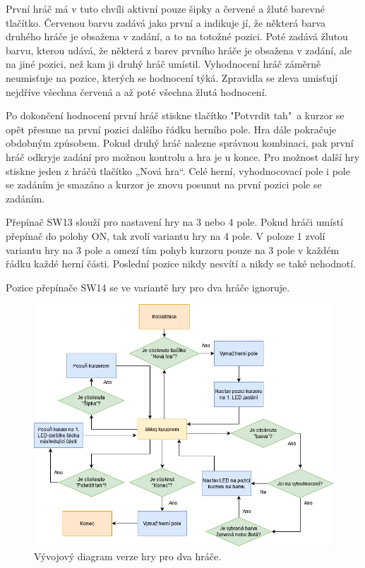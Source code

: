 První hráč má v tuto chvíli aktivní pouze šipky a červené a žluté barevné tlačítko. Červenou barvu zadává jako první a 
indikuje jí, že některá barva druhého hráče je obsažena v zadání, a to na totožné pozici. Poté zadává žlutou barvu, kterou 
udává, že některá z barev prvního hráče je obsažena v zadání, ale na jiné pozici, než kam ji druhý hráč umístil. Vyhodnocení 
hráč záměrně neumisťuje na pozice, kterých se hodnocení týká. Zpravidla se zleva umisťují nejdříve všechna červená a až poté 
všechna žlutá hodnocení. 

Po dokončení hodnocení první hráč stiskne tlačítko "Potvrdit tah"\  a kurzor se opět přesune na první pozici dalšího řádku herního pole. 
Hra dále pokračuje obdobným způsobem.
Pokud druhý hráč nalezne správnou kombinaci, pak první hráč odkryje zadání pro možnou kontrolu a hra je u konce. Pro možnost další 
hry stiskne jeden z hráčů tlačítko „Nová hra“. Celé herní, vyhodnocovací pole i pole se zadáním je smazáno a kurzor je znovu posunut 
na první pozici pole se zadáním. 

Přepínač SW13 slouží pro nastavení hry na 3 nebo 4 pole. Pokud hráči umístí přepínač do polohy ON, tak zvolí variantu hry na 4 pole. 
V poloze 1 zvolí variantu hry na 3 pole a omezí tím pohyb kurzoru pouze na 3 pole v každém řádku každé herní části. Poslední pozice
nikdy nesvítí a nikdy se také nehodnotí. 

Pozice přepínače SW14 se ve variantě hry pro dva hráče ignoruje. 

\begin{figure}[!h]
    \begin{center}
        \includegraphics[scale=0.6]{obrazky/vyvojovy_diagram_2_hraci.png}
    \end{center}
    \caption[Vývojový diagram verze hry pro dva hráče]{Vývojový diagram verze hry pro dva hráče.}
    \end{figure}

